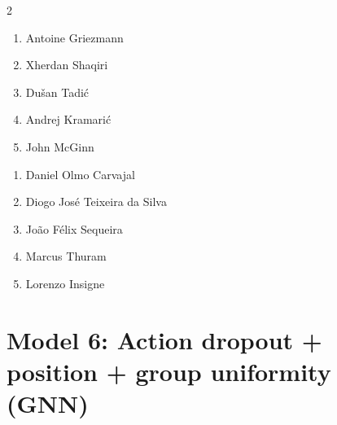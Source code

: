 \documentclass[11pt]{article}
\begin{document}
\begin{multicols}{2}
\begin{samepage}
\begin{tcolorbox}[evalbox,title=\textbf{Lionel Messi (Right Center Forward)} \hfill Score:\ \rule{1cm}{0.4pt}]
\begin{enumerate}
\item Antoine Griezmann
\item Xherdan Shaqiri
\item Dušan Tadić
\item Andrej Kramarić
\item John McGinn
\end{enumerate}
\end{tcolorbox}
\end{samepage}

\begin{samepage}
\begin{tcolorbox}[evalbox,title=\textbf{Kylian Mbappé (Left Wing)} \hfill Score:\ \rule{1cm}{0.4pt}]
\begin{enumerate}
\item Daniel Olmo Carvajal
\item Diogo José Teixeira da Silva
\item João Félix Sequeira
\item Marcus Thuram
\item Lorenzo Insigne
\end{enumerate}
\end{tcolorbox}
\end{samepage}

\end{multicols}

\section*{Model 6: Action dropout + position + group uniformity (GNN)}
\end{document}
